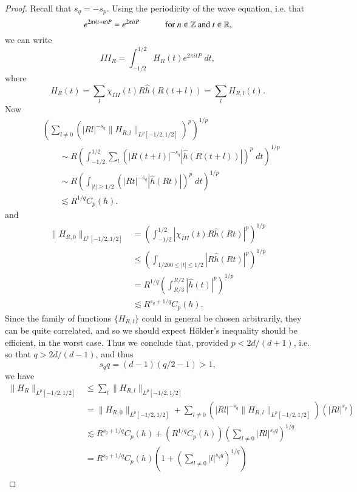 \begin{proof}
    Recall that $s_q = - s_p$. Using the periodicity of the wave equation, i.e. that
    \[ e^{2 \pi i (t + n) P} = e^{2 \pi i t P} \quad\quad\quad\text{for $n \in \operatorname{\mathbb{Z}}$ and $t \in \operatorname{\mathbb{R}}$}, \]
    we can write
    \[ III_R = \int_{-1/2}^{1/2} H_R(t) e^{2 \pi i t P}\; dt, \]
    where
    \[ H_R(t) = \sum_l \chi_{III}(t) R \widehat{h}(R(t + l)) = \sum_l H_{R,l}(t). \]
    Now
    \begin{align*}
        &\left( \sum_{l \neq 0} \left( |Rl|^{-s_q} \| H_{R,l} \|_{L^p[-1/2,1/2]} \right)^p \right)^{1/p}\\
        &\quad\quad \sim R \left( \int_{-1/2}^{1/2} \sum_l \left( |R(t + l)|^{-s_q} |\widehat{h}(R(t + l))| \right)^p\; dt \right)^{1/p}\\
        &\quad\quad\sim R \left( \int_{|t| \geq 1/2} \left( |Rt|^{-s_q} |\widehat{h}(Rt)| \right)^p\; dt \right)^{1/p} \\
        &\quad\quad\lesssim R^{1/q} C_p(h).
    \end{align*}
    and
    \begin{align*}
        \| H_{R,0} \|_{L^p[-1/2,1/2]} &= \left( \int_{-1/2}^{1/2} |\chi_{III}(t) R \widehat{h}(Rt)|^p \right)^{1/p}\\
        &\leq \left( \int_{1/200 \leq |t| \leq 1/2} |R \widehat{h}(Rt)|^p \right)^{1/p}\\
        &= R^{1/q} \left( \int_{R/3}^{R/2} |\widehat{h}(t)|^p \right)^{1/p}\\
        &\lesssim R^{s_q + 1/q} C_p(h).
    \end{align*}
    Since the family of functions $\{ H_{R,l} \}$ could in general be chosen arbitrarily, they can be quite correlated, and so we should expect H\"{o}lder's inequality should be efficient, in the worst case. Thus we conclude that, provided $p < 2d/(d+1)$, i.e. so that $q > 2d/(d-1)$, and thus
    \[ s_q q = (d-1)(q/2 - 1) > 1, \]
    we have
    \begin{align*}
        \| H_R \|_{L^p[-1/2,1/2]} &\leq \sum_l \| H_{R,l} \|_{L^p[-1/2,1/2]}\\
        &= \| H_{R,0} \|_{L^p[-1/2,1/2]} + \sum_{l \neq 0} \left( |Rl|^{-s_q} \| H_{R,l} \|_{L^p[-1/2,1/2]} \right) \left( |Rl|^{s_q} \right)\\
        &\lesssim R^{s_q + 1/q} C_p(h) + ( R^{1/q} C_p(h) ) \left( \sum_{l \neq 0} |Rl|^{s_q q} \right)^{1/q}\\
        &= R^{s_q + 1/q} C_p(h) \left( 1 + \left( \sum_{l \neq 0} |l|^{s_q q} \right)^{1/q} \right)\\

\end{align*}
\end{proof}

